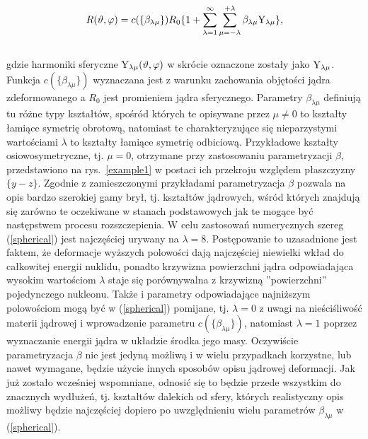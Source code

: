 \documentclass[a4paper,polish]{article}
\numberwithin{equation}{section}
\begin{document}
\begin{eqnarray} \label{spherical}
R(\vartheta ,\varphi)= c(\{\beta_{\lambda \mu} \})R_0\{ 
1+\sum_{\lambda=1}^{\infty} \sum_{\mu=-\lambda}^{+\lambda} \beta_{\lambda \mu} {\rm Y}_{\lambda \mu} \},
\end{eqnarray}
\\
gdzie harmoniki sferyczne ${\rm Y}_{\lambda \mu}(\vartheta ,\varphi)$ w skrócie oznaczone zostały jako ${\rm Y}_{\lambda \mu}$. Funkcja $c(\{\beta_{\lambda \mu} \})$ wyznaczana jest z warunku zachowania objętości jądra zdeformowanego a $R_0$ jest promieniem jądra sferycznego. Parametry $\beta_{\lambda \mu}$ definiują tu różne typy kształtów, spośród których te opisywane przez $\mu \neq 0$ to kształty łamiące symetrię obrotową, natomiast te charakteryzujące się nieparzystymi wartościami $\lambda$ to kształty łamiące symetrię odbiciową. Przykładowe kształty osiowosymetryczne, tj. $\mu = 0$, otrzymane przy zastosowaniu parametryzacji $\beta$, przedstawiono na rys.~\ref{example1} w postaci ich przekroju względem płaszczyzny $\{y-z\}$. Zgodnie z zamieszczonymi przykładami parametryzacja $\beta$ pozwala na opis bardzo szerokiej gamy brył, tj. kształtów jądrowych, wśród których znajdują się zarówno te oczekiwane w stanach podstawowych jak te mogące być następstwem procesu rozszczepienia. W celu zastosowań numerycznych szereg (\ref{spherical}) jest najczęściej urywany na $\lambda = 8$. Postępowanie to uzasadnione jest faktem, że deformacje wyższych polowości dają najczęściej niewielki wkład do całkowitej energii nuklidu, ponadto krzywizna powierzchni jądra  odpowiadająca wysokim wartościom $\lambda$ staje się porównywalna z krzywizną ''powierzchni'' pojedynczego nukleonu. Także i parametry odpowiadające najniższym polowościom mogą być w (\ref{spherical}) pomijane, tj. $\lambda = 0$ z uwagi na nieściśliwość materii jądrowej i wprowadzenie parametru $c(\{\beta_{\lambda \mu} \})$, natomiast $\lambda = 1$ poprzez wyznaczanie energii jądra w układzie środka jego masy. Oczywiście parametryzacja $\beta$ nie jest jedyną możliwą i w wielu przypadkach korzystne, lub nawet wymagane, będzie użycie innych sposobów opisu jądrowej deformacji. Jak już zostało wcześniej wspomniane, odnosić się to będzie przede wszystkim do znacznych wydłużeń, tj. kształtów dalekich od sfery, których realistyczny opis możliwy będzie najczęściej dopiero po uwzględnieniu wielu parametrów $\beta_{\lambda \mu}$ w (\ref{spherical}).
\end{document}
